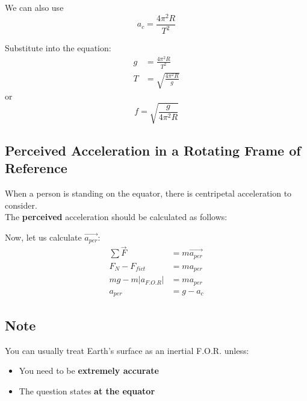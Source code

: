 We can also use
\begin{equation*}
    a_{c} = \frac{4 \pi^2 R}{T^2}
\end{equation*}

Substitute into the equation:
\begin{align*}
    g &= \frac{4 \pi^2 R}{T^2}\\
    T &= \sqrt{\frac{4 \pi^2 R}{g}}
\end{align*}
or
\begin{equation*}
    f = \sqrt{\frac{g}{4 \pi^2 R}}
\end{equation*}

\subsection{Perceived Acceleration in a Rotating Frame of Reference}
When a person is standing on the equator, there is centripetal acceleration to consider.\\

The \textbf{perceived} acceleration should be calculated as follows:

\begin{center}
\end{center}

Now, let us calculate $\vec{a_{per}}$:
\begin{align}
    \sum \vec{F} &= m\vec{a_{per}}\\
    F_N - F_{fict} &= ma_{per}\\
    mg - m\left|a_{F.O.R}\right| &= ma_{per}\\
    a_{per} &= g - a_c
\end{align}

\subsection*{Note}
    You can usually treat Earth's surface as an inertial F.O.R. unless:
    \begin{itemize}
        \item You need to be \textbf{extremely accurate}
        \item The question states \textbf{at the equator}
    \end{itemize}
